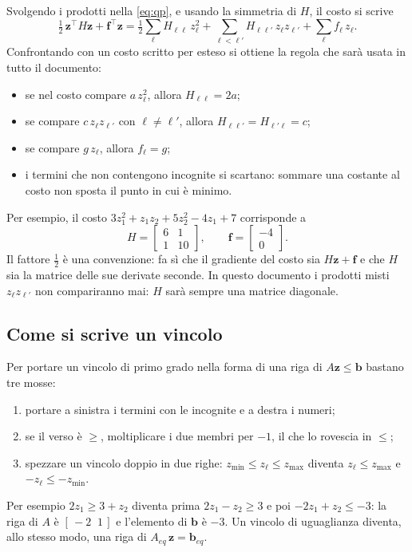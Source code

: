 \documentclass[11pt,a4paper]{article}
\newcommand{\vett}[1]{\boldsymbol{#1}}      %
\begin{document}
Svolgendo i prodotti nella \eqref{eq:qp}, e usando la simmetria di $H$, il
costo si scrive
\begin{equation}
  \tfrac12\, \vett{z}^\top H \vett{z} + \vett{f}^\top \vett{z}
  = \tfrac12 \sum_{\ell} H_{\ell\ell}\, z_\ell^2
    + \sum_{\ell < \ell'} H_{\ell\ell'}\, z_\ell z_{\ell'}
    + \sum_{\ell} f_\ell\, z_\ell .
  \label{eq:scalare}
\end{equation}
Confrontando con un costo scritto per esteso si ottiene la regola che sarà
usata in tutto il documento:
\begin{itemize}
  \item se nel costo compare $a\,z_\ell^2$, allora $H_{\ell\ell} = 2a$;
  \item se compare $c\,z_\ell z_{\ell'}$ con $\ell \ne \ell'$, allora
        $H_{\ell\ell'} = H_{\ell'\ell} = c$;
  \item se compare $g\,z_\ell$, allora $f_\ell = g$;
  \item i termini che non contengono incognite si scartano: sommare una
        costante al costo non sposta il punto in cui è minimo.
\end{itemize}
Per esempio, il costo $3 z_1^2 + z_1 z_2 + 5 z_2^2 - 4 z_1 + 7$ corrisponde a
\[
  H = \begin{bmatrix} 6 & 1 \\ 1 & 10 \end{bmatrix}, \qquad
  \vett{f} = \begin{bmatrix} -4 \\ 0 \end{bmatrix} .
\]
Il fattore $\tfrac12$ è una convenzione: fa sì che il gradiente del costo sia
$H\vett{z} + \vett{f}$ e che $H$ sia la matrice delle sue derivate seconde. In questo
documento i prodotti misti $z_\ell z_{\ell'}$ non compariranno mai: $H$ sarà sempre una
matrice diagonale.

\subsection{Come si scrive un vincolo}\label{sec:regola-vincolo}

Per portare un vincolo di primo grado nella forma di una riga di $A \vett{z} \le \vett{b}$
bastano tre mosse:
\begin{enumerate}
  \item portare a sinistra i termini con le incognite e a destra i numeri;
  \item se il verso è $\ge$, moltiplicare i due membri per $-1$, il che lo
        rovescia in $\le$;
  \item spezzare un vincolo doppio in due righe:
        $z_{\min} \le z_\ell \le z_{\max}$ diventa $z_\ell \le z_{\max}$ e
        $-z_\ell \le -z_{\min}$.
\end{enumerate}
Per esempio $2 z_1 \ge 3 + z_2$ diventa prima $2 z_1 - z_2 \ge 3$ e poi
$-2 z_1 + z_2 \le -3$: la riga di $A$ è $[\,-2 \;\; 1\,]$ e l'elemento di $\vett{b}$ è
$-3$. Un vincolo di uguaglianza diventa, allo stesso modo, una riga di
$A_{eq}\, \vett{z} = \vett{b}_{eq}$.
\end{document}
